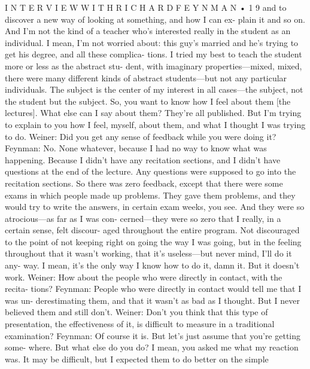 \documentclass[10pt,oneside]{article}
\begin{document}
I N T E R V I E W  W I T H  R I C H A R D  F E Y N M A N • 1 9 and to discover a new way of looking at something, and how I can ex- plain it and so on. And I’m not the kind of a teacher who’s interested really in the student as an individual. I mean, I’m not worried about: this guy’s married and he’s trying to get his degree, and all these complica- tions. I tried my best to teach the student more or less as the abstract stu- dent, with imaginary properties---mixed, mixed, there were many different kinds of abstract students---but not any particular individuals. The subject is the center of my interest in all cases---the subject, not the student but the subject. So, you want to know how I feel about them [the lectures]. What else can I say about them? They’re all published. But I’m trying to explain to you how I feel, myself, about them, and what I thought I was trying to do. Weiner: Did you get any sense of feedback while you were doing it? Feynman: No. None whatever, because I had no way to know what was happening. Because I didn’t have any recitation sections, and I didn’t have questions at the end of the lecture. Any questions were supposed to go into the recitation sections. So there was zero feedback, except that there were some exams in which people made up problems. They gave them problems, and they would try to write the answers, in certain exam weeks, you see. And they were so atrocious---as far as I was con- cerned---they were so zero that I really, in a certain sense, felt discour- aged throughout the entire program. Not discouraged to the point of not keeping right on going the way I was going, but in the feeling throughout that it wasn’t working, that it’s useless---but never mind, I’ll do it any- way. I mean, it’s the only way I know how to do it, damn it. But it doesn’t work. Weiner: How about the people who were directly in contact, with the recita- tions? Feynman: People who were directly in contact would tell me that I was un- derestimating them, and that it wasn’t as bad as I thought. But I never believed them and still don’t. Weiner: Don’t you think that this type of presentation, the effectiveness of it, is difficult to measure in a traditional examination? Feynman: Of course it is. But let’s just assume that you’re getting some- where. But what else do you do? I mean, you asked me what my reaction was. It may be difficult, but I expected them to do better on the simple\par
\end{document}
